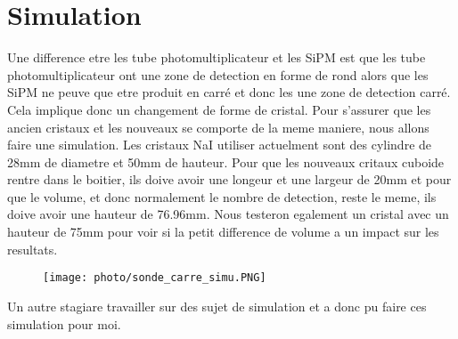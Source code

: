 \section{Simulation}
Une difference etre les tube photomultiplicateur et les SiPM est que les tube photomultiplicateur ont une zone de detection en forme de rond alors que les SiPM ne peuve que etre produit en carré et donc les une zone de detection carré. Cela implique donc un changement de forme de cristal. Pour s'assurer que les ancien cristaux et les nouveaux se comporte de la meme maniere, nous allons faire une simulation. Les cristaux NaI utiliser actuelment sont des cylindre de 28mm de diametre et 50mm de hauteur. Pour que les nouveaux critaux cuboide rentre dans le boitier, ils doive avoir une longeur et une largeur de 20mm et pour que le volume, et donc normalement le nombre de detection, reste le meme, ils doive avoir une hauteur de 76.96mm. Nous testeron egalement un cristal avec un hauteur de 75mm pour voir si la petit difference de volume a un impact sur les resultats.
\begin{figure}
    \centering
    \texttt{[image: photo/sonde\_carre\_simu.PNG]}
\end{figure}

Un autre stagiare travailler sur des sujet de simulation et a donc pu faire ces simulation pour moi. 
